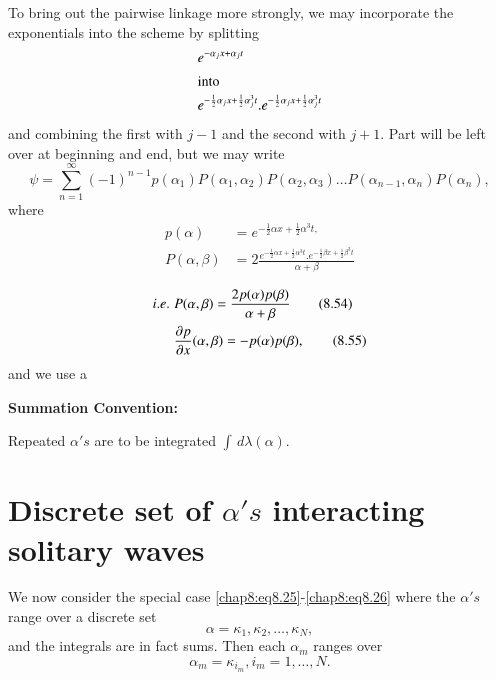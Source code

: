 To bring out the pairwise linkage more strongly, we may incorporate the exponentials into the scheme by splitting 
\begin{align*}
& e^{-\alpha_jx+\alpha_jt}\\
\intertext{into}
&e^{-\frac{1}{2}\alpha_jx+\frac{1}{2}\alpha_j^3 t}.e^{-\frac{1}{2}\alpha_jx+\frac{1}{2}\alpha_j^3 t}
\end{align*}
and combining the first with $j-1$ and the second with $j+1$. Part will be left over at beginning and end, but we may write 
\begin{equation}
\psi=\sum\limits_{n=1}^\infty(-1)^{n-1} p (\alpha_1)P\left(\alpha_1,\alpha_2\right) P\left(\alpha_2,\alpha_3\right)\ldots P\left(\alpha_{n-1},\alpha_n\right)P (\alpha_n),\tag{8.52}\label{chap8:eq8.52}
\end{equation}
where
\begin{equation}
\begin{aligned}
p(\alpha) &= e^{-\frac{1}{2}\alpha x+\frac{1}{2}\alpha^3 t,}\\
P(\alpha,\beta) &= 2 \frac{e^{-\frac{1}{2}\alpha x+\frac{1}{2}\alpha^3 t}.e^{-\frac{1}{2} \beta x+\frac{1}{2}\beta^3 t}}{\alpha +\beta}
\end{aligned}\tag{8.53}\label{chap8:eq8.53}
\end{equation}

\begin{align}
{i.e.}\kern.3em &P(\alpha,\beta)=\frac{2p(\alpha)p(\beta)}{\alpha +\beta} \tag{8.54}\label{chap8:eq8.54}\\
& \frac{\partial p}{\partial x}(\alpha,\beta)=-p(\alpha)p(\beta), \tag{8.55}\label{chap8:eq8.55}
\end{align}\pageoriginale
and we use a
\medskip

{\bf\Large Summation Convention:}

Repeated $\alpha's$ are to be integrated $\int\,d\lambda(\alpha)$.

\section{Discrete set of $\alpha's$ interacting solitary waves}\label{chap8:sec8.5}

We now consider the special case \eqref{chap8:eq8.25}-\eqref{chap8:eq8.26} where the $\alpha's$ range over a discrete set 
$$
\alpha=\kappa_1,\kappa_2,\ldots,\kappa_N,
$$
and the integrals are in fact sums. Then each $\alpha_m$ ranges over 
\begin{equation}
\alpha_m = \kappa_{i_m},i_m=1,\ldots,N.\tag{8.56}\label{chap8:eq8.56}
\end{equation}

